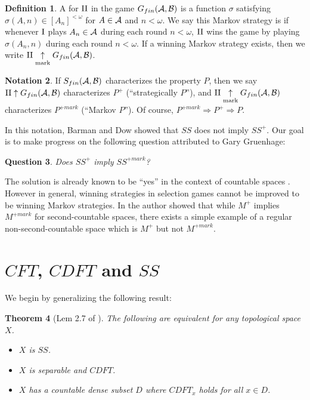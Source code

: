 \documentclass{amsart}
\theoremstyle{plain}
\newtheorem{theorem}{Theorem}
\newtheorem{question}[theorem]{Question}
\theoremstyle{definition}
\newtheorem{definition}[theorem]{Definition}
\newtheorem{notation}[theorem]{Notation}
\theoremstyle{remark}
\theoremstyle{plain}
\theoremstyle{definition}
\theoremstyle{remark}
\begin{document}
\begin{definition}
  A  for \(\mathrm{II}\) in the game
  \(G_{fin}(\mathcal{A},\mathcal{B})\)
  is a function \(\sigma\) satisfying
  \(\sigma(A,n)\in[A_n]^{<\omega}\) for
  \(A\in\mathcal{A}\) and \(n<\omega\). We say this Markov strategy is
   if whenever \(\mathrm{I}\) plays \(A_n\in\mathcal{A}\) during each
  round \(n<\omega\), \(\mathrm{II}\) wins the game by playing
  \(\sigma(A_n,n)\) during each round \(n<\omega\).
  If a winning Markov strategy exists, then we write
  \(\mathrm{II}\underset{\text{mark}}{\uparrow}G_{fin}(\mathcal{A},\mathcal{B})\).
\end{definition}

\begin{notation}
  If \(S_{fin}(\mathcal{A},\mathcal{B})\) characterizes the property \(P\),
  then we say \(\mathrm{II}\uparrow G_{fin}(\mathcal{A},\mathcal{B})\) characterizes
  \(P^+\) (``strategically \(P\)''), and
  \(\mathrm{II}\underset{\text{mark}}{\uparrow}G_{fin}(\mathcal{A},\mathcal{B})\) characterizes
  \(P^{+mark}\) (``Markov \(P\)'').
  Of course, \(P^{+mark}\Rightarrow P^+ \Rightarrow P\).
\end{notation}

In this notation,
Barman and Dow showed that \(SS\) does not imply
\(SS^+\). Our goal is to make progress on the following question
attributed to Gary Gruenhage:

\begin{question}\label{mainQuestion}
  Does \(SS^+\) imply \(SS^{+mark}\)?
\end{question}

The solution is already known to be ``yes'' in the context of countable spaces
\cite{MR2678950}. However in general, winning strategies in selection games
cannot be improved to be winning Markov strategies. In
\cite{clontzMengerGamePreprint} the author showed that while \(M^+\) implies
\(M^{+mark}\) for second-countable spaces, there exists a simple
example of a regular non-second-countable space which is
\(M^+\) but not \(M^{+mark}\).



\section{\(CFT\), \(CDFT\) and \(SS\)}

We begin by generalizing the following result:

\begin{theorem}[Lem 2.7 of \cite{MR2678950}]
  The following are equivalent for any topological space \(X\).
  \begin{itemize}
    \item \(X\) is \(SS\).
    \item \(X\) is separable and \(CDFT\).
    \item \(X\) has a countable dense subset \(D\) where
          \(CDFT_x\) holds for all \(x\in D\).
  \end{itemize}
\end{theorem}
\end{document}

